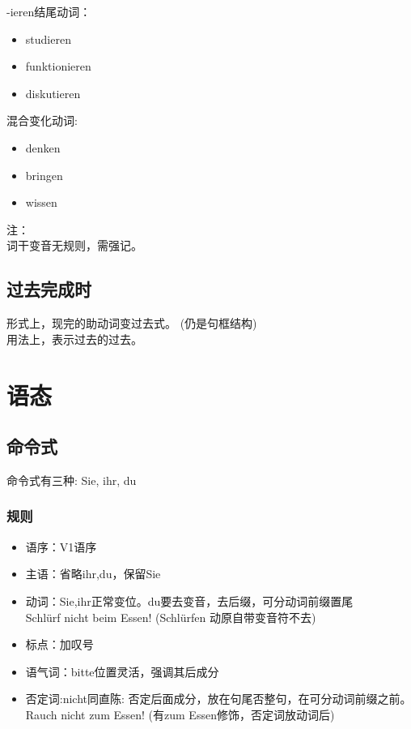 -ieren结尾动词：
\begin{itemize}
    \item studieren
    \item funktionieren
    \item diskutieren
\end{itemize}

混合变化动词:
\begin{itemize}
    \item denken 
    \item bringen 
    \item wissen 
\end{itemize}

注：\\
词干变音无规则，需强记。

\subsection{过去完成时}
形式上，现完的助动词变过去式。 (仍是句框结构)\\
用法上，表示过去的过去。

\section{语态}
\subsection{命令式}
命令式有三种: Sie, ihr, du \\
\subsubsection{规则}
\begin{itemize}
    \item 语序：V1语序
    \item 主语：省略ihr,du，保留Sie
    \item 动词：Sie,ihr正常变位。du要去变音，去后缀，可分动词前缀置尾 \\
          Schlürf nicht beim Essen! (Schlürfen 动原自带变音符不去)
    \item 标点：加叹号
    \item 语气词：bitte位置灵活，强调其后成分
    \item 否定词:nicht同直陈: 否定后面成分，放在句尾否整句，在可分动词前缀之前。\\
          Rauch nicht zum Essen! (有zum Essen修饰，否定词放动词后)
\end{itemize}
